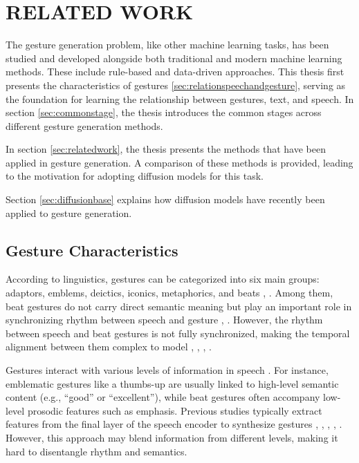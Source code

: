 \chapter{RELATED WORK}
\label{Chapter2}

The gesture generation problem, like other machine learning tasks, has been studied and developed alongside both traditional and modern machine learning methods. These include rule-based and data-driven approaches. This thesis first presents the characteristics of gestures \autoref{sec:relationspeechandgesture}, serving as the foundation for learning the relationship between gestures, text, and speech. In section \autoref{sec:commonstage}, the thesis introduces the common stages across different gesture generation methods.

In section \autoref{sec:relatedwork}, the thesis presents the methods that have been applied in gesture generation. A comparison of these methods is provided, leading to the motivation for adopting diffusion models for this task.

Section \autoref{sec:diffusionbase} explains how diffusion models have recently been applied to gesture generation.

\section{Gesture Characteristics}
\label{sec:relationspeechandgesture}

According to linguistics, gestures can be categorized into six main groups: adaptors, emblems, deictics, iconics, metaphorics, and beats \cite{ekman1969repertoire}, \cite{sebeok2011advances}. Among them, beat gestures do not carry direct semantic meaning but play an important role in synchronizing rhythm between speech and gesture \cite{kipp2005gesture}, \cite{sebeok2011advances}. However, the rhythm between speech and beat gestures is not fully synchronized, making the temporal alignment between them complex to model \cite{mcclave1994gestural}, \cite{bhattacharya2021speech2affectivegestures}, \cite{kucherenko2020gesticulator}, \cite{yoon2020speech}.

Gestures interact with various levels of information in speech \cite{sebeok2011advances}. For instance, emblematic gestures like a thumbs-up are usually linked to high-level semantic content (e.g., “good” or “excellent”), while beat gestures often accompany low-level prosodic features such as emphasis. Previous studies typically extract features from the final layer of the speech encoder to synthesize gestures \cite{alexanderson2020style}, \cite{bhattacharya2021speech2affectivegestures}, \cite{kucherenko2021large}, \cite{qian2021speech}, \cite{yoon2022genea}. However, this approach may blend information from different levels, making it hard to disentangle rhythm and semantics.

